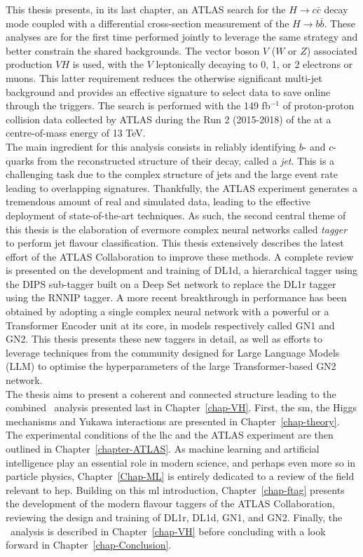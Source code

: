 This thesis presents, in its last chapter, an ATLAS search for the $H \rightarrow c\bar{c}$ decay mode coupled with a differential cross-section measurement of the $H \rightarrow b\bar{b}$. These analyses are for the first time performed jointly to leverage the same strategy and better constrain the shared backgrounds. The vector boson $V$ ($W$ or $Z$) associated production $VH$ is used, with the $V$ leptonically decaying to 0, 1, or 2 electrons or muons. This latter requirement reduces the otherwise significant multi-jet background and provides an effective signature to select data to save online through the triggers. The search is performed with the 149 fb$^{-1}$ of proton-proton collision data collected by ATLAS during the Run 2 (2015-2018) of the  at a centre-of-mass energy of 13 TeV. \\

The main ingredient for this analysis consists in reliably identifying $b$- and $c$-quarks from the reconstructed structure of their decay, called a \textit{jet}. This is a challenging task due to the complex structure of jets and the large event rate leading to overlapping signatures. Thankfully, the ATLAS experiment generates a tremendous amount of real and simulated data, leading to the effective deployment of state-of-the-art  techniques. As such, the second central theme of this thesis is the elaboration of evermore complex neural networks called \textit{tagger} to perform jet flavour classification. This thesis extensively describes the latest effort of the ATLAS Collaboration to improve these methods. A complete review is presented on the development and training of DL1d, a hierarchical tagger using the DIPS sub-tagger built on a Deep Set network to replace the DL1r tagger using the RNNIP tagger. A more recent breakthrough in performance has been obtained by adopting a single complex neural network with a powerful  or a Transformer Encoder unit at its core, in models respectively called GN1 and GN2. This thesis presents these new taggers in detail, as well as efforts to leverage techniques from the  community designed for Large Language Models (LLM) to optimise the hyperparameters of the large Transformer-based GN2 network. \\

The thesis aims to present a coherent and connected structure leading to the combined \vhbc\ analysis presented last in Chapter~\ref{chap-VH}. First, the \gls{sm}, the Higgs mechanisms and Yukawa interactions are presented in Chapter~\ref{chap-theory}. The experimental conditions of the \gls{lhc} and the ATLAS experiment are then outlined in Chapter~\ref{chapter-ATLAS}. As machine learning and artificial intelligence play an essential role in modern science, and perhaps even more so in particle physics, Chapter~\ref{Chap-ML} is entirely dedicated to a review of the field relevant to \gls{hep}. Building on this \gls{ml} introduction, Chapter~\ref{chap-ftag} presents the development of the modern flavour taggers of the ATLAS Collaboration, reviewing the design and training of DL1r, DL1d, GN1, and GN2. Finally, the \vhbc\ analysis is described in Chapter~\ref{chap-VH} before concluding with a look forward in Chapter~\ref{chap-Conclusion}.